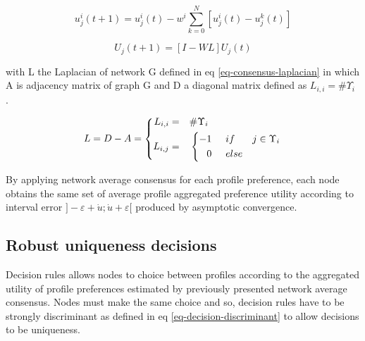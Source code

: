 \documentclass[conference]{IEEEtran}
\begin{document}
\begin{equation}
\label{eq-consensus-analytic}
\displaystyle
u_j^i(t+1) = u_j^i(t) - w^i \sum_{k=0}^N[u_j^i(t) - u_j^k(t)]
\end{equation}

\begin{equation}
\label{eq-consensus-matrix}
\displaystyle
U_j(t+1) = [I-WL]U_j(t)
\end{equation}

with L the Laplacian of network G defined in eq \ref{eq-consensus-laplacian} in which A is adjacency matrix of graph G and D a diagonal matrix defined as $L_{i,i} = \#\Upsilon_i$ .

\begin{equation}
\label{eq-consensus-laplacian}
L = D - A = \left\{
      \begin{aligned}
      L_{i,i} &= &\#\Upsilon_i\hspace{2.6cm}\\
      L_{i,j} &= &\left\{
                \begin{aligned}
                -1 \hspace{0.5cm} &if& j \in \Upsilon_i \\
                 0 \hspace{0.5cm} &else& \\
                \end{aligned}
                \right.
      \end{aligned}
    \right.
\end{equation}

By applying network average consensus for each profile preference, each node obtains the same set of average profile aggregated preference utility according to interval error $]- \varepsilon + \dot{u} ; \dot{u} + \varepsilon [$ produced by asymptotic convergence.

\subsection{Robust uniqueness decisions}
Decision rules allows nodes to choice between profiles according to the aggregated utility of profile preferences estimated by previously presented network average consensus. Nodes must make the same choice and so, decision rules have to be strongly discriminant as defined in eq \ref{eq-decision-discriminant} to allow decisions to be uniqueness. 
\end{document}
